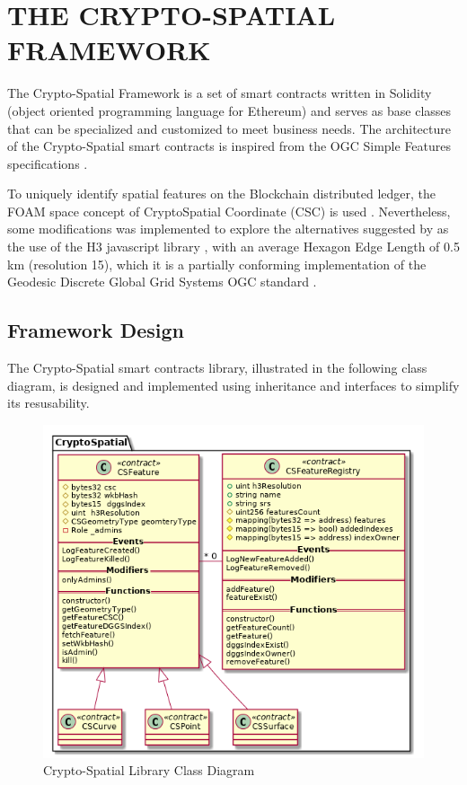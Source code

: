 \documentclass{isprs} %
\begin{document}
\newpage

\section{THE CRYPTO-SPATIAL FRAMEWORK}\label{sec:THE CRYPTO-SPATIAL FRAMEWORK}

The Crypto-Spatial Framework is a set of smart contracts written in Solidity (object oriented programming language for Ethereum) and serves as base classes that can be specialized and customized to meet business needs. The architecture of the Crypto-Spatial smart contracts is inspired from the OGC Simple Features specifications \cite{herring2011opengis}. 

To uniquely identify spatial features on the Blockchain distributed ledger, the FOAM space concept of CryptoSpatial Coordinate (CSC) is used \cite{foamwhitepaper2018}. Nevertheless, some modifications was implemented to explore the alternatives suggested by \cite{ogcdiscuss} as the use of the H3 javascript library \cite{h3}, with an average Hexagon Edge Length  of 0.5 km (resolution 15), which it is a partially conforming implementation of the Geodesic Discrete Global Grid Systems OGC standard \cite{purss2016ogc}.

\subsection{Framework Design}\label{sec:Framework Design}

The Crypto-Spatial smart contracts library, illustrated in the following class diagram, is designed and implemented using inheritance and interfaces to simplify its resusability.

\begin{figure}[ht!]
\begin{center}
		\includegraphics[width=1.0\columnwidth]{figures/class-crypto-spatial-lib.png}
	\caption{Crypto-Spatial Library Class Diagram}
\label{fig:figure_cs_lib_class}
\end{center}
\end{figure}
\end{document}
